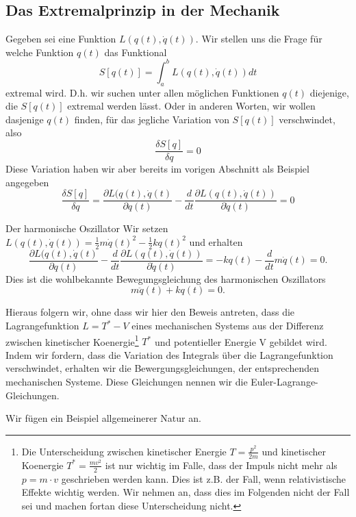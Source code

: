 \subsection{Das Extremalprinzip in der Mechanik}
Gegeben sei eine Funktion $L(q(t),\dot q(t))$. Wir stellen uns die Frage für
welche Funktion $q(t)$ das Funktional
\[
  S[q(t)]=\int_a^b L(q(t),\dot q(t)) dt
\]
extremal wird. D.h. wir suchen unter allen möglichen Funktionen $q(t)$
diejenige, die $S[q(t)]$ extremal werden lässt. Oder in anderen Worten, wir
wollen dasjenige $q(t)$ finden, für das jegliche Variation von $S[q(t)]$
verschwindet, also 
\[\frac{\delta S[q]}{\delta q}=0\]
Diese Variation haben wir aber bereits im vorigen Abschnitt als Beispiel angegeben
\[
  \frac{\delta S[q]}{\delta q}=\frac{\partial L(q(t),\dot q(t)}{\partial q(t)}
    -\frac{d}{dt} \frac{\partial L(q(t),\dot q(t))}{\partial \dot q(t)}=0
\]
\begin{note}{Der harmonische Oszillator}
Wir setzen $L(q(t),\dot q(t))=\frac{1}{2}m\dot
q(t)^2-\frac{1}{2}k q(t)^2$ und erhalten
\[ \frac{\partial L(q(t),\dot q(t)}{\partial q(t)}
    -\frac{d}{dt} \frac{\partial L(q(t),\dot q(t))}{\partial \dot q(t)}=
   -kq(t)-\frac{d}{dt}m\dot q(t)
   =0.
 \]
 Dies ist die wohlbekannte Bewegungsgleichung des harmonischen Oszillators\newline 
 \[m\ddot q(t)+kq(t)=0.\]

Hieraus folgern wir, ohne dass wir hier den Beweis antreten, dass die
Lagrangefunktion $L=T^*-V$ eines mechanischen Systems aus der Differenz
zwischen kinetischer 
Koenergie\footnote{Die Unterscheidung zwischen kinetischer Energie
  $T=\frac{p^2}{2m}$ und kinetischer Koenergie $T^* =\frac{mv^2}{2}$ ist nur
  wichtig im Falle, dass der Impuls nicht mehr als $p=m\cdot v$ geschrieben
  werden kann. Dies ist z.B. der Fall, wenn relativistische Effekte wichtig
  werden. Wir nehmen an, dass dies im Folgenden nicht der Fall sei und machen
  fortan diese Unterscheidung nicht.}
%
$T^*$ und potentieller Energie V gebildet wird. Indem wir fordern, dass die
Variation des Integrals über die Lagrangefunktion verschwindet, erhalten wir
die Bewergungsgleichungen, der entsprechenden mechanischen Systeme. Diese
Gleichungen nennen wir die Euler-Lagrange-Gleichungen.
\end{note}
Wir fügen ein Beispiel allgemeinerer Natur an.
